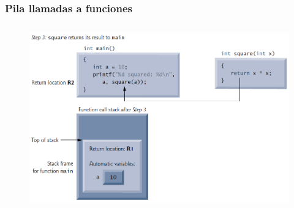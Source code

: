 \documentclass[10.5pt,scale=1.0,t,aspectratio=169,hyperref={pdfpagelabels=false}]{beamer}
\begin{document}
\begin{frame}
	\frametitle{Pila llamadas a funciones}
	\begin{columns}
		\begin{figure}
			\centering
			\includegraphics[scale=0.45]{Stack3}
		\end{figure}
		
		
	\end{columns}
\end{frame}
\end{document}
